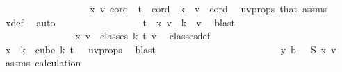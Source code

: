 \begin{isabellebody}
\ \ \isanewline
\ \ \ \ \ \ \ \ \ \ \ \ \ \ \isamarkupfalse%
\ {\isachardoublequoteopen}x\ v\ cord\ {\isasymnoteq}\ t{\isachardoublequoteclose}\ \ {\isachardoublequoteopen}cord\ {\isasymin}\ {\isacharbraceleft}{\kern0pt}{\isachardot}{\kern0pt}{\isachardot}{\kern0pt}{\isacharless}{\kern0pt}k\ {\isacharminus}{\kern0pt}\ v{\isacharbraceright}{\kern0pt}{\isachardoublequoteclose}\ \ cord\ \isamarkupfalse%
\ uv{\isacharunderscore}{\kern0pt}props\ that\ assms{\isacharparenleft}{\kern0pt}{}{\isacharparenright}{\kern0pt}\ \isamarkupfalse%
\ x{\isacharunderscore}{\kern0pt}def\ \isamarkupfalse%
\ auto\isanewline
\ \ \ \ \ \ \ \ \ \ \ \ \ \ \isamarkupfalse%
\ \isamarkupfalse%
\ {\isachardoublequoteopen}t\ {\isasymnotin}\ x\ v\ {\isacharbackquote}{\kern0pt}\ {\isacharbraceleft}{\kern0pt}{\isachardot}{\kern0pt}{\isachardot}{\kern0pt}{\isacharless}{\kern0pt}k\ {\isacharminus}{\kern0pt}\ v{\isacharbraceright}{\kern0pt}{\isachardoublequoteclose}\ \isamarkupfalse%
\ blast\isanewline
\ \ \ \ \ \ \ \ \ \ \ \ \isacommand{{\isacharbraceright}{\kern0pt}}\isamarkupfalse%
\isanewline
\ \ \ \ \ \ \ \ \ \ \ \ \isamarkupfalse%
\ \isamarkupfalse%
\ {\isachardoublequoteopen}x\ v\ {\isasymin}\ classes\ k\ t\ v{\isachardoublequoteclose}\ \isamarkupfalse%
\ classes{\isacharunderscore}{\kern0pt}def\ \isanewline
\ \ \ \ \ \ \ \ \ \ \ \ \ \ \isamarkupfalse%
\ {\isacartoucheopen}x\ {\isacharbackquote}{\kern0pt}\ {\isacharbraceleft}{\kern0pt}{\isachardot}{\kern0pt}{\isachardot}{\kern0pt}k{\isacharbraceright}{\kern0pt}\ {\isasymsubseteq}\ cube\ k\ {\isacharparenleft}{\kern0pt}t\ {\isacharplus}{\kern0pt}\ {}{\isacharparenright}{\kern0pt}{\isacartoucheclose}\ uv{\isacharunderscore}{\kern0pt}props\ \isamarkupfalse%
\ blast\isanewline
\ \ \ \ \ \ \ \ \ \ \isamarkupfalse%
\isanewline
\ \ \ \ \ \ \ \ \ \ \isamarkupfalse%
\ \isamarkupfalse%
\ {\isachardoublequoteopen}{\isasymchi}\ {\isacharparenleft}{\kern0pt}y\ b{\isacharparenright}{\kern0pt}\ {\isacharequal}{\kern0pt}\ {\isasymchi}\ {\isacharparenleft}{\kern0pt}S\ {\isacharparenleft}{\kern0pt}x\ v{\isacharparenright}{\kern0pt}{\isacharparenright}{\kern0pt}{\isachardoublequoteclose}\ \isamarkupfalse%
\ assms{\isacharparenleft}{\kern0pt}{}{\isacharparenright}{\kern0pt}\ calculation{\isacharparenleft}{\kern0pt}{}{\isacharcomma}{\kern0pt}\ {}{\isacharparenright}{\kern0pt}\ \isamarkupfalse%

\end{isabellebody}
